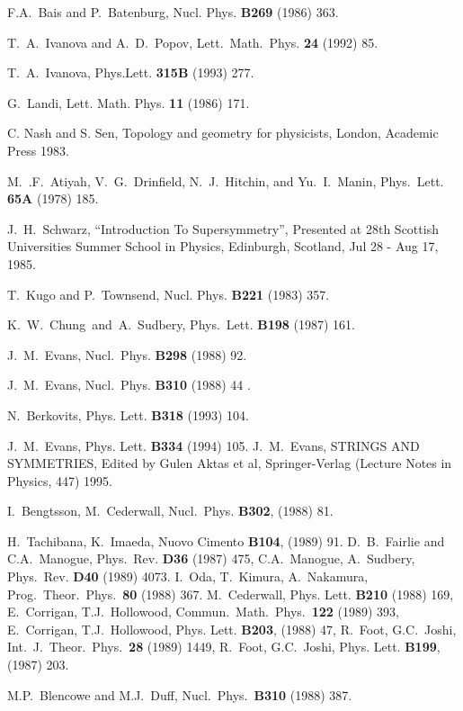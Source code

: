 \documentclass[a4paper,12pt]{book}
\begin{document}
\begin{thebibliography}{999}
  F.A.~Bais and P.~Batenburg, Nucl. Phys. \textbf{B269} (1986)
363.

  T.~A.~Ivanova and A.~D.~Popov, Lett.~Math.~Phys. \textbf{24}
(1992) 85.

  T.~A.~Ivanova, Phys.Lett. \textbf{315B} (1993) 277.

  G.~Landi, Lett. Math. Phys. \textbf{11} (1986) 171.

  C. Nash and S. Sen, Topology and geometry for physicists,
London, Academic Press 1983.

  M.~.F.~Atiyah, V.~G.~Drinfield, N.~J.~Hitchin, and
Yu.~I.~Manin, Phys.~Lett. \textbf{65A} (1978) 185.

  J.~H.~Schwarz, ``Introduction To Supersymmetry'', Presented at
28th Scottish Universities Summer School in Physics, Edinburgh, Scotland,
Jul 28 - Aug 17, 1985.

  T.~Kugo and P.~Townsend, Nucl. Phys. \textbf{B221} (1983) 357.

  K.~W.~Chung~and~A.~Sudbery, Phys.~Lett. \textbf{B198} (1987)
161.

  J.~M.~Evans, Nucl.~Phys. \textbf{B298} (1988) 92.

  J.~M.~Evans, Nucl.~Phys. \textbf{B310} (1988) 44 .

  N.~Berkovits, Phys. Lett. \textbf{B318} (1993) 104.

  J.~M.~Evans, Phys. Lett. \textbf{B334} (1994) 105.
J.~M.~Evans, STRINGS AND SYMMETRIES, Edited by Gulen Aktas et al,
Springer-Verlag (Lecture Notes in Physics, 447) 1995.

  I.~Bengtsson, M.~Cederwall, Nucl.~Phys. \textbf{B302}, (1988)
81.

  H.~Tachibana, K.~Imaeda, Nuovo Cimento \textbf{B104}, (1989)
91. D.~B.~Fairlie and C.A.~Manogue, Phys.~Rev. \textbf{D36} (1987) 475,
C.A.~Manogue, A.~Sudbery, Phys.~Rev. \textbf{D40} (1989) 4073. I.~Oda,
T.~Kimura, A.~Nakamura, Prog.~Theor.~Phys.~\textbf{80} (1988) 367.
M.~Cederwall, Phys. Lett. \textbf{B210} (1988) 169, E.~Corrigan,
T.J.~Hollowood, Commun.~Math.~Phys.~\textbf{122} (1989) 393, E.~Corrigan,
T.J.~Hollowood, Phys. Lett. \textbf{B203}, (1988) 47, R.~Foot, G.C.~Joshi,
Int.~J.~Theor.~Phys.~\textbf{28} (1989) 1449, R.~Foot, G.C.~Joshi, Phys.
Lett. \textbf{B199}, (1987) 203.

  {M.P.~Blencowe and M.J.~Duff, Nucl.~Phys.~\textbf{B310}
(1988) 387.}


\end{thebibliography}
\end{document}
